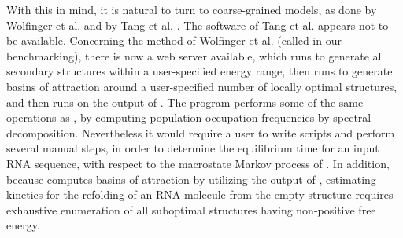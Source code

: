 \documentclass[11pt, oneside]{Thesis} %
\providecommand{\DIFaddbegin}{} %
\providecommand{\DIFaddend}{} %
\providecommand{\DIFdelbegin}{} %
\providecommand{\DIFdelend}{} %
\begin{document}
With this in mind, it is natural to turn to \DIFdelbegin %
\DIFdelend coarse-grained \DIFdelbegin %
\DIFdelend models,
as done by Wolfinger et al. \citep{wolfingerstadler:kinetics} and by
Tang et al. \citep{tang.jmb08}. The software of Tang et al. appears not
to be available. Concerning the method of Wolfinger et al. (called
\DIFdelbegin %
\DIFdelend \DIFaddbegin \barrierseq \DIFaddend in our benchmarking), there is now a web server available,
which runs \rnasub \citep{wuchty.b99} to generate all secondary structures within
a user-specified energy range, then runs \barriers \citep{flammhofacker}
to generate basins of attraction around a user-specified number of locally
optimal structures, and then runs \treekin on the output of \barriers.
The program \treekin performs some of the same operations as \hermes,
by computing population occupation frequencies by spectral decomposition.
Nevertheless it would require a user to write scripts and perform
several manual steps, in order to determine the equilibrium time for
an input RNA sequence, with respect to the macrostate Markov process
of \citep{wolfingerstadler:kinetics}. In addition, because \barriers computes
basins of attraction by utilizing the output of \rnasub, estimating kinetics
for the refolding of an RNA molecule from the empty structure requires
exhaustive enumeration of all suboptimal structures having non-positive
free energy.
\end{document}
